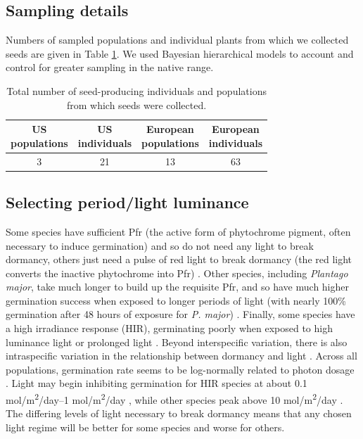 \documentclass[12pt]{article}\usepackage[]{graphicx}\usepackage[]{color}
\begin{document}
\subsection{Sampling details}
Numbers of sampled populations and individual plants from which we collected seeds are given in Table \ref{tab:seednum}. We used Bayesian hierarchical models to account and control for   greater sampling in the native range. %
	\begin{center}
		\begin{table}[H]
			\centering
			\caption {Total number of seed-producing individuals and populations from which seeds were collected.} \label{tab:seeds}  
			\begin{tabular}{c|c|c|c}
				\makecell{\textbf{US} \\ \textbf{populations}} & \makecell{\textbf{US} \\  \textbf{individuals}} & \makecell{\textbf{European} \\ \textbf{populations}} & \makecell{\textbf{European} \\ \textbf{individuals}} \\
				\hline
				3&	21&	13&	63\\
			\end{tabular}
			\label{tab:seednum}
		\end{table}
	\end{center}
	
\subsection{Selecting period/light luminance}
Some species have sufficient Pfr (the active form of phytochrome pigment, often necessary to induce germination) and so do not need any light to break dormancy, others just need a pulse of red light to break dormancy (the red light converts the inactive phytochrome into Pfr) \parencite{Casal998}.  Other species, including \textit{Plantago major}, take much longer to build up the requisite Pfr, and so have much higher germination success when exposed to longer periods of light (with nearly 100\% germination after 48 hours of exposure for \textit{P. major}) \parencite{Pons1991}. Finally, some species have a high irradiance response (HIR), germinating poorly when exposed to high luminance light or prolonged light \parencite{Roberts1987}. Beyond interspecific variation, there is also intraspecific variation in the relationship between dormancy and light \parencite{Probert1986}. Across all populations, germination rate seems to be log-normally related to photon dosage \parencite{Ellis1986}. Light may begin inhibiting germination for HIR species at about 0.1 mol/m\textsuperscript{2}/day--1 mol/m\textsuperscript{2}/day \parencite{Baskin1998,Ellis1986}, while other species peak above 10 mol/m\textsuperscript{2}/day \parencite{Ellis1986}. The differing levels of light necessary to break dormancy means that any chosen light regime will be better for some species and worse for others. 
	
\end{document}
